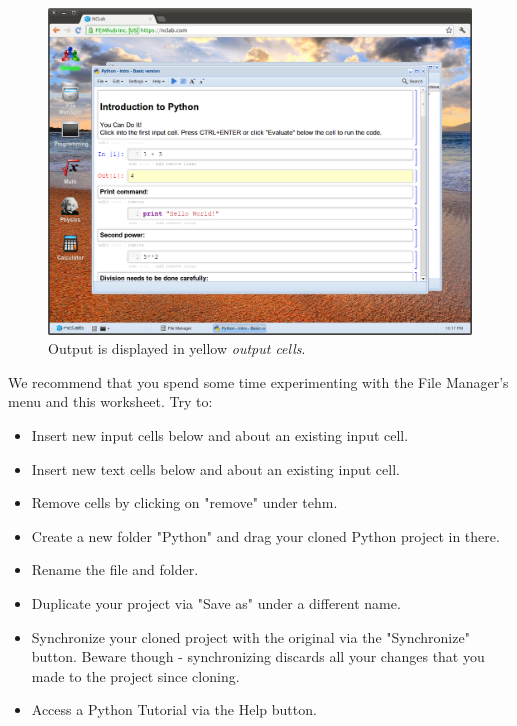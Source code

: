 \documentclass[article,A4,12pt]{llncs}
\begin{document}
\begin{figure}[!ht]
\begin{center}
\includegraphics[width=\textwidth]{img/fileman5.png}
\end{center}
\caption{Output is displayed in yellow {\em output cells}.}
\label{fig:fileman5}
\end{figure}
\noindent
We recommend that you spend some time experimenting with the 
File Manager's menu and this worksheet. Try to:
\begin{itemize}
\item Insert new input cells below and about an existing input cell.
\item Insert new text cells below and about an existing input cell.
\item Remove cells by clicking on "remove" under tehm.
\item Create a new folder "Python" and drag your cloned Python 
      project in there. 
\item Rename the file and folder.
\item Duplicate your project via "Save as" under a different name.
\item Synchronize your cloned project with the original via the 
      "Synchronize" button. Beware though - synchronizing discards 
      all your changes that you made to the project since cloning. 
\item Access a Python Tutorial via the Help button.
\end{itemize}
\end{document}
